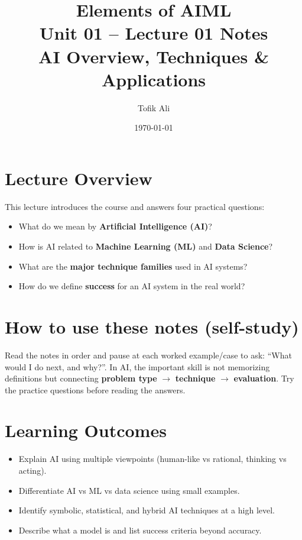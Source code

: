 \documentclass[11pt]{article}
\title{Elements of AIML\\Unit 01 -- Lecture 01 Notes\\AI Overview, Techniques \& Applications}
\author{Tofik Ali}
\date{\today}
\begin{document}
\maketitle
\tableofcontents

\section{Lecture Overview}
This lecture introduces the course and answers four practical questions:
\begin{itemize}[leftmargin=*]
  \item What do we mean by \textbf{Artificial Intelligence (AI)}?
  \item How is AI related to \textbf{Machine Learning (ML)} and \textbf{Data Science}?
  \item What are the \textbf{major technique families} used in AI systems?
  \item How do we define \textbf{success} for an AI system in the real world?
\end{itemize}
\notesources{\AIMLUnitISources}

\section{How to use these notes (self-study)}
Read the notes in order and pause at each worked example/case to ask: ``What would I do next, and why?''.
In AI, the important skill is not memorizing definitions but connecting \textbf{problem type} $\rightarrow$ \textbf{technique} $\rightarrow$ \textbf{evaluation}.
Try the practice questions before reading the answers.

\section{Learning Outcomes}
\begin{itemize}[leftmargin=*]
  \item Explain AI using multiple viewpoints (human-like vs rational, thinking vs acting).
  \item Differentiate AI vs ML vs data science using small examples.
  \item Identify symbolic, statistical, and hybrid AI techniques at a high level.
  \item Describe what a model is and list success criteria beyond accuracy.
\end{itemize}
\end{document}
